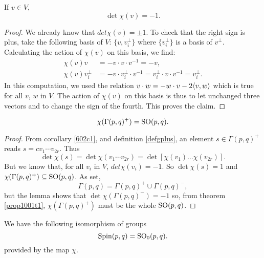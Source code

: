 \begin{lemma}
If $v\in V$,
\begin{equation}
                 \det\chi(v)=-1.
\end{equation}
\end{lemma}

\begin{proof}
We already know that $det\chi(v)=\pm 1$. To check that the right sign is plus, take the following basis of $V$: $\{v,v_i^{\perp}\}$ where $\{v_i^{\perp}\}$ is a basis of $v^{\perp}$. Calculating the action of $\chi(v)$ on this basis, we find:
\begin{equation}
\begin{split}
 \chi(v)v&=-v\cdot v\cdot v^{-1}=-v,\\
 \chi(v)v_i^{\perp}&=-v\cdot v_i^{\perp}\cdot v^{-1}
                   =v_i^{\perp}\cdot v\cdot v^{-1}
                   =v_i^{\perp}.
\end{split}
\end{equation}
In this computation, we used the relation $v\cdot w=-w\cdot v-2\langle v,w\rangle$ which is true for all $v$, $w$ in $V$. The action of $\chi(v)$ on this basis is thus to let unchanged three vectors and to change the sign of the fourth. This proves the claim.
\end{proof}

\begin{theorem}
\begin{equation}
                   \chi(\Gamma(p,q)^+)=\operatorname{SO}(p,q).
\end{equation}
\label{2102p1}
\end{theorem}

\begin{proof}
From corollary \ref{602c1}, and definition \ref{defgplus}, an element $s\in\Gamma(p,q)^+$ reads $s=cv_1\cdots v_{2r}$. Thus
\begin{equation}
 \det\chi(s)=\det\chi(v_1\cdots v_{2r})
            =\det\left[\chi(v_1)\ldots\chi(v_{2r})\right].
\end{equation}
 But we know that, for all $v_i$ in $V$, $det\chi(v_i)=-1$. So $\det\chi(s)=1$ and $\chi(\Gamma(p,q)^+)\subseteq \operatorname{SO}(p,q)$. As set, 
\[
  \Gamma(p,q)=\Gamma(p,q)^+\cup\Gamma(p,q)^-,
\]
but the lemma shows that $\det\chi(\Gamma(p,q)^-)=-1$ so, from theorem \ref{prop1001t1}, $\chi(\Gamma(p,q)^+)$ must be the whole $\operatorname{SO}(p,q)$.
\end{proof}


\begin{theorem}
We have the following isomorphism of groups
\[ 
  \operatorname{Spin}(p,q)=\operatorname{SO}_0(p,q).
\]
provided by the map $\chi$.
\end{theorem}


